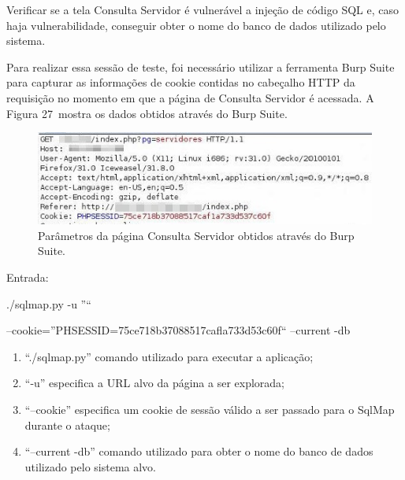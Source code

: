 \documentclass[
    12pt,               %
    openright,          %
    oneside,            %
    a4paper,            %
    section=TITLE,     %
    english,            %
    french,             %
    spanish,            %
    brazil              %
    ]{abntex2}
\begin{document}
Verificar se a tela Consulta Servidor é vulnerável a injeção de código SQL e, caso haja vulnerabilidade, conseguir obter o nome do banco de dados utilizado pelo sistema.


Para realizar essa sessão de teste, foi necessário utilizar a ferramenta Burp Suite para capturar as informações de cookie contidas no cabeçalho HTTP da requisição no momento em que a página de Consulta Servidor é acessada. A Figura 27~mostra os dados obtidos através do Burp Suite.





\begin{figure}[htp]
\centering
\caption{Parâmetros da página Consulta Servidor obtidos através do Burp Suite.}
\includegraphics[width=450px]{imagem23Editada.jpeg}
\end{figure}
\ifdefined\FloatBarrier \FloatBarrier \fi


Entrada:


./sqlmap.py -u ''``


--cookie=''PHSESSID=75ce718b37088517cafla733d53c60f`` --current -db



\begin{enumerate}[start=1]
	
\item \textquotedblleft{}./sqlmap.py\textquotedblright{} comando utilizado para executar a aplicação;
	
\item \textquotedblleft{}-u\textquotedblright{} especifica a URL alvo da página a ser explorada;
	
\item \textquotedblleft{}--cookie\textquotedblright{} especifica um cookie de sessão válido a ser passado para o SqlMap durante o ataque;
	
\item \textquotedblleft{}--current -db\textquotedblright{} comando utilizado para obter o nome do banco de dados utilizado pelo sistema alvo.

\end{enumerate}
\end{document}
